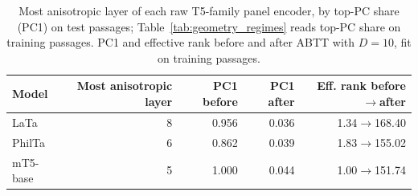 \begin{table}[t]
\centering
\small
\begin{tabular}{lrrrr}
\toprule
\textbf{Model} & \textbf{Most anisotropic layer} & \textbf{PC1 before} & \textbf{PC1 after} & \textbf{Eff. rank before$\rightarrow$after} \\
\midrule
LaTa & 8 & 0.956 & 0.036 & 1.34$\rightarrow$168.40 \\
PhilTa & 6 & 0.862 & 0.039 & 1.83$\rightarrow$155.02 \\
mT5-base & 5 & 1.000 & 0.044 & 1.00$\rightarrow$151.74 \\
\bottomrule
\end{tabular}
\caption{Most anisotropic layer of each raw T5-family panel encoder, by top-PC share (PC1) on test passages; Table~\ref{tab:geometry_regimes} reads top-PC share on training passages. PC1 and effective rank before and after ABTT with $D=10$, fit on training passages.}
\label{tab:layer_diagnostics_main}
\end{table}
